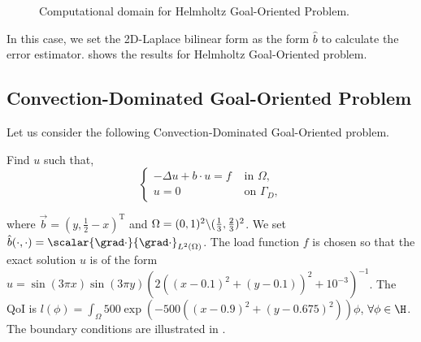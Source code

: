 \begin{figure}
  \caption{Computational domain for Helmholtz Goal-Oriented Problem.\label{fig:HelmGOA}}
\end{figure}

\noindent In this case, we set the 2D-Laplace bilinear form as the form $\hat{b}$ to calculate the error estimator.  shows the results for Helmholtz Goal-Oriented problem.
%
\subsection{Convection-Dominated Goal-Oriented Problem}
Let us consider the following Convection-Dominated Goal-Oriented problem.
\begin{var_for}
  Find $u$ such that,
  \begin{equation}
    \begin{cases}
      - \Delta u +b \cdot u= f & \text{ in } \Omega,       \\
      u=0                      & \text{ on } {\Gamma_{D}},
    \end{cases}
  \end{equation}
\end{var_for}
\noindent where $\vec{b} = (y,\frac{1}{2}-x)^{\textrm{T}}$ and $\Omega=(0,1)^{2}\symbol{92} (\frac{1}{3},\frac{2}{3})^{2}$. We set $\hat{b}(\cdot,\cdot)= \scalar{\grad \cdot}{\grad \cdot}_{L^{2}(\Omega)}$. The load function $f$ is chosen so that the exact solution $u$ is of the form $u = \sin(3 \pi x) \sin(3 \pi y) (2((x-0.1)^2 + (y-0.1))^2+10^{-3})^{-1}$. The \ac{QoI} is $l(\phi)=\int_{\Omega} 500 \exp (-500((x-0.9)^2 +(y-0.675)^2))\phi$, $\forall \phi \in \H$. The boundary conditions are illustrated in .

